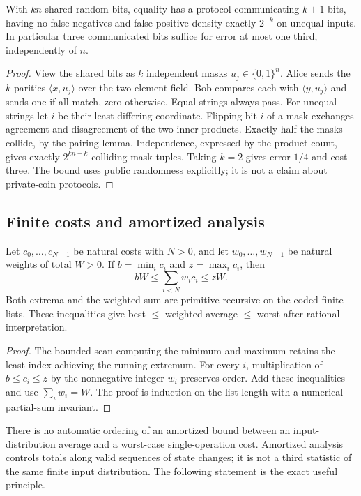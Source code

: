 \begin{theorem}
\label{thm:R20}
With $kn$ shared random bits, equality has a protocol communicating
$k+1$ bits, having no false negatives and false-positive density exactly
$2^{-k}$ on unequal inputs. In particular three communicated bits suffice
for error at most one third, independently of $n$.
\end{theorem}
\begin{proof}
View the shared bits as $k$ independent masks $u_j\in\{0,1\}^n$.
Alice sends the $k$ parities $\langle x,u_j\rangle$ over the two-element
field. Bob compares each with $\langle y,u_j\rangle$ and sends one if
all match, zero otherwise. Equal strings always pass. For unequal strings
let $i$ be their least differing coordinate. Flipping bit $i$ of a mask
exchanges agreement and disagreement of the two inner products. Exactly
half the masks collide, by the pairing lemma. Independence, expressed
by the product count, gives exactly $2^{kn-k}$ colliding mask tuples.
Taking $k=2$ gives error $1/4$ and cost three. The bound uses public
randomness explicitly; it is not a claim about private-coin protocols.
\end{proof}

\subsection{Finite costs and amortized analysis}

\begin{theorem}
\label{thm:R21}
Let $c_0,\ldots,c_{N-1}$ be natural costs with $N>0$, and let
$w_0,\ldots,w_{N-1}$ be natural weights of total $W>0$. If
$b=\min_i c_i$ and $z=\max_i c_i$, then
\[
 bW\leq\sum_{i<N}w_ic_i\leq zW.
\]
Both extrema and the weighted sum are primitive recursive on the coded
finite lists. These inequalities give best $\leq$ weighted average
$\leq$ worst after rational interpretation.
\end{theorem}
\begin{proof}
The bounded scan computing the minimum and maximum retains the least
index achieving the running extremum. For every $i$, multiplication of
$b\leq c_i\leq z$ by the nonnegative integer $w_i$ preserves order.
Add these inequalities and use $\sum_i w_i=W$. The proof is induction
on the list length with a numerical partial-sum invariant.
\end{proof}

There is no automatic ordering of an amortized bound between an
input-distribution average and a worst-case single-operation cost.
Amortized analysis controls totals along valid sequences of state changes;
it is not a third statistic of the same finite input distribution. The
following statement is the exact useful principle.

